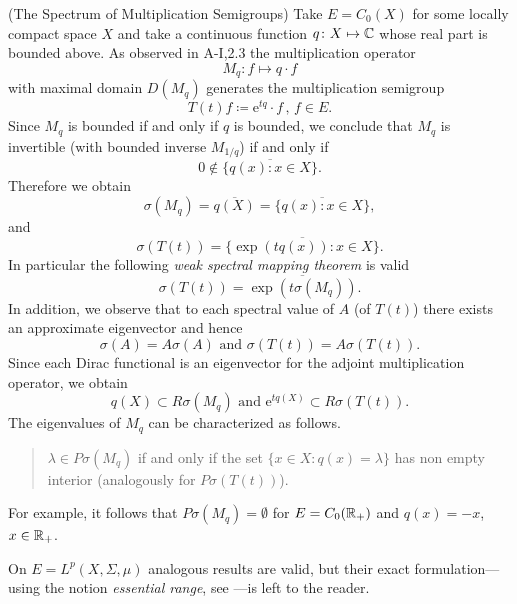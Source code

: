 \begin{example}{(The Spectrum of Multiplication Semigroups)}\label{ex:a3-2.3}%
Take $E = C_{0}(X)$ for some locally compact space $X$ and take a continuous function $q \colon X \mapsto \mathbb{C}$ whose real part is bounded above.
As observed in A-I,2.3 the multiplication operator
\[
M_{q} \colon f \mapsto q \cdot f
\]
with maximal domain $D(M_{q})$ generates the multiplication semigroup
\[
T(t)f \coloneqq \mathrm{e}^{tq} \cdot f \, , \, f \in E .
\]
Since $M_{q}$ is bounded if and only if $q$ is bounded, we conclude that $M_{q}$ is invertible (with bounded inverse $M_{1/q}$) if and only if
\[
0 \notin \overline{\{q(x)  \colon x \in X\}} .
\]
Therefore we obtain
\[
\sigma(M_{q}) = \overline{q(X)} = \overline{\{q(x) \colon x \in X\}} ,
\]
and
\[
\sigma(T(t)) = \overline{\{\exp(tq(x)) \colon x \in X\}} .
\]
In particular the following \emph{weak spectral mapping theorem} is valid
\[
\sigma(T(t)) = \overline{\exp(t\sigma(M_{q}))} .
\]
In addition, we observe that to each spectral value of $A$ (\resp of $T(t)$) there exists an approximate eigenvector and hence
\[
\sigma(A) = A\sigma(A) \text{ and } \sigma(T(t)) = A\sigma(T(t)) .
\]
Since each Dirac functional is an eigenvector for the adjoint multiplication operator, we obtain
\[
q(X) \subset R\sigma(M_{q}) \text{ and } \mathrm{e}^{tq(X)} \subset R\sigma(T(t)) .
\]
The eigenvalues of $M_{q}$ can be characterized as follows.
\begin{quote}
$\lambda \in P\sigma(M_{q})$ if and only if the set $\{x \in X \colon q(x) = \lambda\}$ has non empty interior (analogously for $P\sigma(T(t))$).
\end{quote}
For example, it follows that $P\sigma(M_{q}) = \emptyset$ for $E = C_{0}(\mathbb{R}_{+})$ and $q(x) = -x$, $x \in \mathbb{R}_{+}$.

On $E = L^{p}(X,\Sigma,\mu)$ analogous results are valid, but their exact formulation---using the notion \emph{essential range}, see \citet{goldstein:1985a}---is left to the reader.
\end{example}
